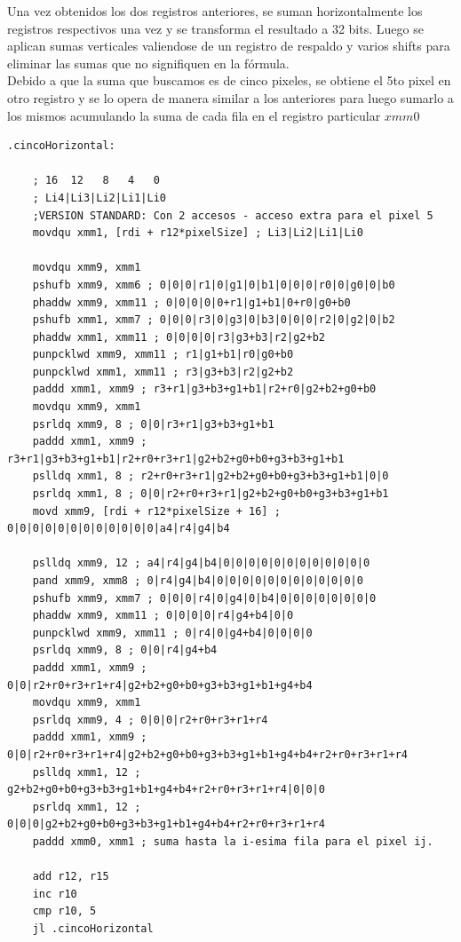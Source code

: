 Una vez obtenidos los dos registros anteriores, se suman horizontalmente los registros respectivos una vez y se transforma el resultado a 32 bits. Luego se aplican sumas verticales valiendose de un registro de respaldo y varios shifts para eliminar las sumas que no signifiquen en la fórmula.\\

Debido a que la suma que buscamos es de cinco pixeles, se obtiene el 5to pixel en otro registro y se lo opera de manera similar a los anteriores para luego sumarlo a los mismos acumulando la suma de cada fila en el registro particular $xmm0$

\begin{codesnippet}
\begin{verbatim}
.cincoHorizontal:

	; 16  12   8   4   0
	; Li4|Li3|Li2|Li1|Li0
    ;VERSION STANDARD: Con 2 accesos - acceso extra para el pixel 5
    movdqu xmm1, [rdi + r12*pixelSize] ; Li3|Li2|Li1|Li0

	movdqu xmm9, xmm1
	pshufb xmm9, xmm6 ; 0|0|0|r1|0|g1|0|b1|0|0|0|r0|0|g0|0|b0
	phaddw xmm9, xmm11 ; 0|0|0|0|0+r1|g1+b1|0+r0|g0+b0
	pshufb xmm1, xmm7 ; 0|0|0|r3|0|g3|0|b3|0|0|0|r2|0|g2|0|b2
    phaddw xmm1, xmm11 ; 0|0|0|0|r3|g3+b3|r2|g2+b2
    punpcklwd xmm9, xmm11 ; r1|g1+b1|r0|g0+b0
    punpcklwd xmm1, xmm11 ; r3|g3+b3|r2|g2+b2
    paddd xmm1, xmm9 ; r3+r1|g3+b3+g1+b1|r2+r0|g2+b2+g0+b0
    movdqu xmm9, xmm1
    psrldq xmm9, 8 ; 0|0|r3+r1|g3+b3+g1+b1
    paddd xmm1, xmm9 ; r3+r1|g3+b3+g1+b1|r2+r0+r3+r1|g2+b2+g0+b0+g3+b3+g1+b1
    pslldq xmm1, 8 ; r2+r0+r3+r1|g2+b2+g0+b0+g3+b3+g1+b1|0|0
    psrldq xmm1, 8 ; 0|0|r2+r0+r3+r1|g2+b2+g0+b0+g3+b3+g1+b1
	movd xmm9, [rdi + r12*pixelSize + 16] ; 0|0|0|0|0|0|0|0|0|0|0|0|a4|r4|g4|b4

	pslldq xmm9, 12 ; a4|r4|g4|b4|0|0|0|0|0|0|0|0|0|0|0|0
	pand xmm9, xmm8 ; 0|r4|g4|b4|0|0|0|0|0|0|0|0|0|0|0|0
	pshufb xmm9, xmm7 ; 0|0|0|r4|0|g4|0|b4|0|0|0|0|0|0|0|0
	phaddw xmm9, xmm11 ; 0|0|0|0|r4|g4+b4|0|0
	punpcklwd xmm9, xmm11 ; 0|r4|0|g4+b4|0|0|0|0
	psrldq xmm9, 8 ; 0|0|r4|g4+b4
	paddd xmm1, xmm9 ; 0|0|r2+r0+r3+r1+r4|g2+b2+g0+b0+g3+b3+g1+b1+g4+b4
	movdqu xmm9, xmm1
	psrldq xmm9, 4 ; 0|0|0|r2+r0+r3+r1+r4
	paddd xmm1, xmm9 ; 0|0|r2+r0+r3+r1+r4|g2+b2+g0+b0+g3+b3+g1+b1+g4+b4+r2+r0+r3+r1+r4
	pslldq xmm1, 12 ; g2+b2+g0+b0+g3+b3+g1+b1+g4+b4+r2+r0+r3+r1+r4|0|0|0
	psrldq xmm1, 12 ; 0|0|0|g2+b2+g0+b0+g3+b3+g1+b1+g4+b4+r2+r0+r3+r1+r4
	paddd xmm0, xmm1 ; suma hasta la i-esima fila para el pixel ij.

	add r12, r15
	inc r10
	cmp r10, 5
	jl .cincoHorizontal
    
\end{verbatim}
\end{codesnippet}

